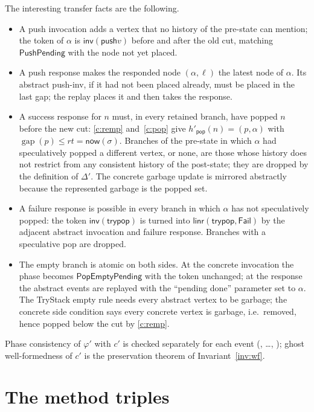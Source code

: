 \documentclass[11pt]{article}
\theoremstyle{definition}
\theoremstyle{remark}
\newcommand{\gap}{\mathop{\mathrm{gap}}}
\newcommand{\Inv}{\mathsf{inv}}
\newcommand{\Linr}{\mathsf{linr}}
\newcommand{\Push}{\mathsf{push}}
\newcommand{\TryPop}{\mathsf{trypop}}
\newcommand{\Fail}{\mathsf{Fail}}
\newcommand{\poss}{\Delta}
\newcommand{\conc}{\sigma}
\newcommand{\code}[1]{\texttt{\detokenize{#1}}}
\newcommand{\now}{\mathsf{now}}
\newcommand{\phase}[1]{\mathsf{#1}}
\newcommand{\pop}{\mathsf{pop}}
\begin{document}
The interesting transfer facts are the following.
\begin{itemize}[nosep]
\item A push invocation adds a vertex that no history of the pre-state can
  mention; the token of \(\alpha\) is \(\Inv(\Push v)\) before and after the
  old cut, matching \(\phase{PushPending}\) with the node not yet placed.
\item A push response makes the responded node \((\alpha,\ell)\) the latest
  node of \(\alpha\).  Its abstract push-inv, if it had not been placed
  already, must be placed in the last gap; the replay places it and then
  takes the response.
\item A success response for \(n\) must, in every retained branch, have
  popped \(n\) before the new cut: \ref{c:remp} and~\ref{c:pop} give
  \(h'_\pop(n)=(p,\alpha)\) with \(\gap(p)\le rt=\now(\conc)\).  Branches of
  the pre-state in which \(\alpha\) had speculatively popped a different
  vertex, or none, are those whose history does not restrict from any
  consistent history of the post-state; they are dropped by the definition
  of \(\poss'\).  The concrete garbage update is mirrored abstractly because
  the represented garbage is the popped set.
\item A failure response is possible in every branch in which \(\alpha\) has
  not speculatively popped: the token \(\Inv(\TryPop)\) is turned into
  \(\Linr(\TryPop,\Fail)\) by the adjacent abstract invocation and failure
  response.  Branches with a speculative pop are dropped.
\item The empty branch is atomic on both sides.  At the concrete invocation
  the phase becomes \(\phase{PopEmptyPending}\) with the token unchanged; at
  the response the abstract events are replayed with the ``pending done''
  parameter set to \(\alpha\).  The TryStack empty rule needs every abstract
  vertex to be garbage; the concrete side condition says every concrete
  vertex is garbage, i.e.\ removed, hence popped below the cut by
  \ref{c:remp}.
\end{itemize}

Phase consistency of \(\varphi'\) with \(c'\) is checked separately for
each event (\code{pc_push_inv}, \ldots, \code{pc_empty_res}); ghost
well-formedness of \(c'\) is the preservation theorem of
Invariant~\ref{inv:wf}.

\section{The method triples}
\end{document}
